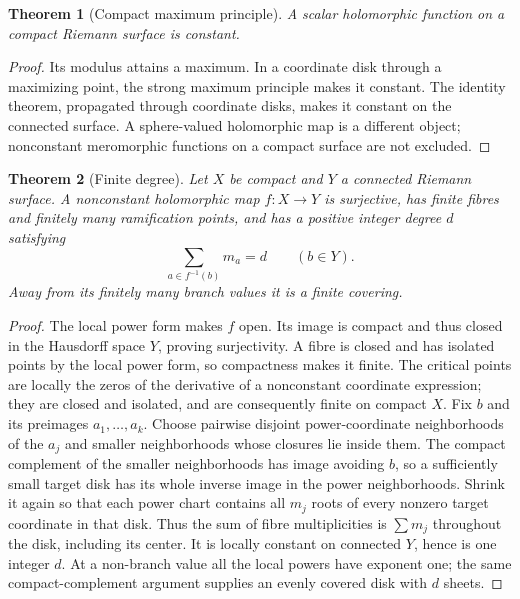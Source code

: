 \documentclass[11pt,a4paper,openany]{book}
\newtheorem{theorem}{Theorem}[chapter]
\theoremstyle{definition}
\theoremstyle{remark}\newtheorem{remark}[theorem]{Remark}
\newcommand{\family}[1]{}
\begin{document}
\begin{theorem}[Compact maximum principle]\label{d12:20-06}\family{D12.20.06}
A scalar holomorphic function on a compact Riemann surface is constant.
\end{theorem}
\begin{proof}
Its modulus attains a maximum. In a coordinate disk through a maximizing
point, the strong maximum principle makes it constant. The identity
theorem, propagated through coordinate disks, makes it constant on the
connected surface. A sphere-valued holomorphic map is a different object;
nonconstant meromorphic functions on a compact surface are not excluded.
\end{proof}

\begin{theorem}[Finite degree]\label{d12:20-07}\family{D12.20.07}
Let $X$ be compact and $Y$ a connected Riemann surface. A nonconstant
holomorphic map $f:X\to Y$ is surjective, has finite fibres and finitely
many ramification points, and has a positive integer degree $d$ satisfying
\[
                         \sum_{a\in f^{-1}(b)}m_a=d\qquad(b\in Y).
\]
Away from its finitely many branch values it is a finite covering.
\end{theorem}
\begin{proof}
The local power form makes $f$ open. Its image is compact and thus closed
in the Hausdorff space $Y$, proving surjectivity. A fibre is closed and
has isolated points by the local power form, so compactness makes it
finite. The critical points are locally the zeros of the derivative of a
nonconstant coordinate expression; they are closed and isolated, and
are consequently finite on compact $X$.
Fix $b$ and its preimages $a_1,\ldots,a_k$. Choose pairwise disjoint
power-coordinate neighborhoods of the $a_j$ and smaller neighborhoods
whose closures lie inside them. The compact complement of the smaller
neighborhoods has image avoiding $b$, so a sufficiently small target
disk has its whole inverse image in the power neighborhoods. Shrink it
again so that each power chart contains all $m_j$ roots of every nonzero
target coordinate in that disk. Thus the sum of fibre multiplicities is
$\sum m_j$ throughout the disk, including its center. It is locally
constant on connected $Y$, hence is one integer $d$. At a non-branch
value all the local powers have exponent one; the same compact-complement
argument supplies an evenly covered disk with $d$ sheets.
\end{proof}
\end{document}

